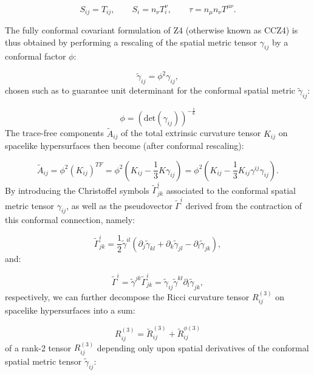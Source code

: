 \documentclass{article}
\begin{document}
\begin{equation}
S_{i j} = T_{i j}, \qquad S_i = n_{\nu} T_{i}^{\nu}, \qquad \tau = n_{\mu} n_{\nu} T^{\mu \nu}.
\end{equation}

The fully conformal  covariant formulation of Z4 (otherwise known as CCZ4) is thus obtained by performing a rescaling of the spatial metric tensor ${\gamma_{i j}}$ by a conformal factor ${\phi}$\cite{bernuzzi}\cite{hilditch}:

\begin{equation}
\tilde{\gamma}_{i j} = \phi^2 \gamma_{i j},
\end{equation}
chosen such as to guarantee unit determinant for the conformal spatial metric ${\tilde{\gamma}_{i j}}$:

\begin{equation}
\phi = \left( \mathrm{det} \left( \gamma_{i j} \right) \right)^{- \frac{1}{6}}
\end{equation}
The trace-free components ${\tilde{A}_{i j}}$ of the total extrinsic curvature tensor ${K_{i j}}$ on spacelike hypersurfaces then become (after conformal rescaling):

\begin{equation}
\tilde{A}_{i j} = \phi^2 \left( K_{i j} \right)^{TF} = \phi^2 \left( K_{i j} - \frac{1}{3} K \gamma_{i j} \right) = \phi^2 \left( K_{i j} - \frac{1}{3} K_{i j} \gamma^{i j} \gamma_{i j} \right).
\end{equation}
By introducing the Christoffel symbols ${\tilde{\Gamma}_{j k}^{i}}$ associated to the conformal spatial metric tensor ${\gamma_{i j}}$, as well as the pseudovector ${\tilde{\Gamma}^{i}}$ derived from the contraction of this conformal connection, namely:

\begin{equation}
\tilde{\Gamma}_{j k}^{i} = \frac{1}{2} \tilde{\gamma}^{i l} \left( \partial_j \tilde{\gamma}_{k l} + \partial_k \tilde{\gamma}_{j l} - \partial_l \tilde{\gamma}_{j k} \right),
\end{equation}
and:

\begin{equation}
\tilde{\Gamma}^i = \tilde{\gamma}^{j k} \tilde{\Gamma}_{j k}^{i} = \tilde{\gamma}_{i j} \tilde{\gamma}^{k l} \partial_l \tilde{\gamma}_{j k},
\end{equation}
respectively, we can further decompose the Ricci curvature tensor ${R_{i j}^{\left( 3 \right)}}$ on spacelike hypersurfaces into a sum:

\begin{equation}
R_{i j}^{\left( 3 \right)} = \tilde{R}_{i j}^{\left( 3 \right)} + \tilde{R}_{i j}^{\phi \left( 3 \right)}
\end{equation}
of a rank-2 tensor ${R_{i j}^{\left( 3 \right)}}$ depending only upon spatial derivatives of the conformal spatial metric tensor ${\tilde{\gamma}_{i j}}$:
\end{document}
